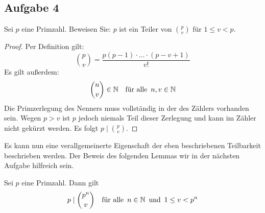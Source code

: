 \newpage
\subsection{Aufgabe 4}
Sei $p$ eine Primzahl. Beweisen Sie: $p$ ist ein Teiler von $\binom{p}{v}$
für $1 \leq v < p$.
\begin{proof}
  Per Definition gilt:
  \begin{equation*}
    \binom{p}{v} = \frac{p(p-1) \cdot \ldots \cdot (p - v + 1)}{v!}
  \end{equation*}
  Es gilt außerdem:
  \begin{equation*}
    \binom{n}{v} \in \mathbb{N}{} \quad
    \text{für alle} \enspace n,v \in \mathbb{N}{}
  \end{equation*}
  Die Primzerlegung des Nenners muss
  vollständig in der des Zählers vorhanden sein.
  Wegen $p > v$ ist $p$ jedoch niemals Teil dieser Zerlegung und
  kann im Zähler nicht gekürzt werden.
  Es folgt $p \mid \binom{p}{v}$.
\end{proof}
\noindent
Es kann nun eine verallgemeinerte Eigenschaft der eben beschriebenen
Teilbarkeit beschrieben werden. Der Beweis des folgenden Lemmas wir
in der nächsten Aufgabe hilfreich sein.
\begin{lemma}
  Sei $p$ eine Primzahl. Dann gilt
  \begin{equation*}
    p \mid \binom{p^n}{v} \quad \text{für alle} \enspace n \in \mathbb{N}{}
    \enspace \text{und} \enspace 1 \leq v < p^n
  \end{equation*}
\end{lemma}
